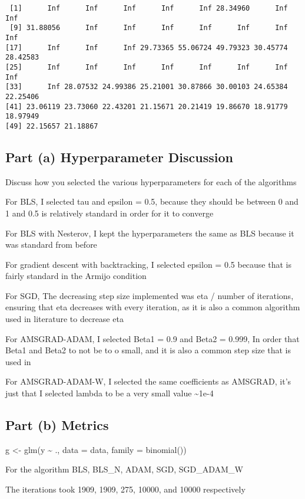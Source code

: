 \documentclass[
  letterpaper,
  DIV=11,
  numbers=noendperiod]{scrartcl}
\newenvironment{Shaded}{\begin{snugshade}}{\end{snugshade}}
\newcommand{\AttributeTok}[1]{\textcolor[rgb]{0.40,0.45,0.13}{#1}}
\newcommand{\FunctionTok}[1]{\textcolor[rgb]{0.28,0.35,0.67}{#1}}
\newcommand{\NormalTok}[1]{\textcolor[rgb]{0.00,0.23,0.31}{#1}}
\newcommand{\OtherTok}[1]{\textcolor[rgb]{0.00,0.23,0.31}{#1}}
\newcommand{\SpecialCharTok}[1]{\textcolor[rgb]{0.37,0.37,0.37}{#1}}
\begin{document}
\begin{verbatim}
 [1]      Inf      Inf      Inf      Inf      Inf 28.34960      Inf      Inf
 [9] 31.88056      Inf      Inf      Inf      Inf      Inf      Inf      Inf
[17]      Inf      Inf      Inf 29.73365 55.06724 49.79323 30.45774 28.42583
[25]      Inf      Inf      Inf      Inf      Inf      Inf      Inf      Inf
[33]      Inf 28.07532 24.99386 25.21001 30.87866 30.00103 24.65384 22.25406
[41] 23.06119 23.73060 22.43201 21.15671 20.21419 19.86670 18.91779 18.97949
[49] 22.15657 21.18867
\end{verbatim}

\subsection{Part (a) Hyperparameter
Discussion}\label{part-a-hyperparameter-discussion}

Discuss how you selected the various hyperparameters for each of the
algorithms

For BLS, I selected tau and epsilon = 0.5, because they should be
between 0 and 1 and 0.5 is relatively standard in order for it to
converge

For BLS with Nesterov, I kept the hyperparameters the same as BLS
because it was standard from before

For gradient descent with backtracking, I selected epsilon = 0.5 because
that is fairly standard in the Armijo condition

For SGD, The decreasing step size implemented was eta / number of
iterations, ensuring that eta decreases with every iteration, as it is
also a common algorithm used in literature to decrease eta

For AMSGRAD-ADAM, I selected Beta1 = 0.9 and Beta2 = 0.999, In order
that Beta1 and Beta2 to not be to o small, and it is also a common step
size that is used in

For AMSGRAD-ADAM-W, I selected the same coefficients as AMSGRAD, it's
just that I selected lambda to be a very small value \textasciitilde1e-4

\subsection{Part (b) Metrics}\label{part-b-metrics}

\begin{Shaded}
\begin{Highlighting}[]
\NormalTok{g }\OtherTok{\textless{}{-}} \FunctionTok{glm}\NormalTok{(y }\SpecialCharTok{\textasciitilde{}}\NormalTok{ ., }\AttributeTok{data =}\NormalTok{ data, }\AttributeTok{family =} \FunctionTok{binomial}\NormalTok{())}
\end{Highlighting}
\end{Shaded}

For the algorithm BLS, BLS\_N, ADAM, SGD, SGD\_ADAM\_W

The iterations took 1909, 1909, 275, 10000, and 10000 respectively
\end{document}
